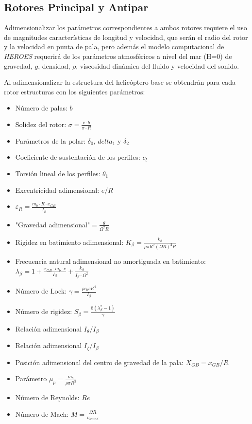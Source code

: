 \subsection{Rotores Principal y Antipar}

Adimensionalizar los parámetros correspondientes a ambos rotores requiere el uso de magnitudes características de longitud y velocidad, que serán el radio del rotor y la velocidad en punta de pala, pero además el modelo computacional de \emph{HEROES} requerirá de los parámetros atmosféricos a nivel del mar (H=0) de gravedad, $g$, densidad, $\rho$, viscosidad dinámica del fluido y velocidad del sonido.

Al adimensionalizar la estructura del helicóptero base se obtendrán para cada rotor estructuras con los siguientes parámetros:
\singlespacing
\begin{multicols}{2}
	\begin{itemize}
		\item Número de palas: $b$
		\item Solidez del rotor: $\sigma=\frac{c\cdot b}{\pi\cdot R}$
		\item Parámetros de la polar: $\delta_0$, $delta_1$ y $\delta_2$
		\item Coeficiente de sustentación de los perfiles: $c_l$
		\item Torsión lineal de los perfiles: $\theta_1$
		\item Excentricidad adimensional: $e/R$
		\item $\varepsilon_R=\frac{m_b\cdot R\cdot x_{GB}}{I_\beta}$
		\item "Gravedad adimensional"$=\frac{g}{\Omega^2R}$
		\item Rigidez en batimiento adimensional: $K_\beta=\frac{k_\beta}{\rho \pi R^2(\Omega R)^2R}$
		\item Frecuencia natural adimensional no amortiguada en batimiento: $\lambda_\beta=1+\frac{x_{GB}\cdot m_b\cdot e}{I_\beta}+\frac{k_\beta}{I_\beta\cdot\Omega^2}$
		\item Número de Lock: $\gamma=\frac{\rho c_0cR^4}{I_\beta}$
		\item Número de rigidez: $S_\beta=\frac{8(\lambda_\beta^2-1)}{\gamma}$
		\item Relación adimensional $I_\theta/I_\beta$
		\item Relación adimensional $I_\zeta/I_\beta$
		\item Posición adimensional del centro de gravedad de la pala: $X_{GB}=x_{GB}/R$
		\item Parámetro $\mu_p=\frac{m_b}{\rho\pi R^3}$
		\item Número de Reynolds: $Re$
		\item Número de Mach: $M=\frac{\Omega R}{v_{sound}}$
		\end{itemize}
\end{multicols}
